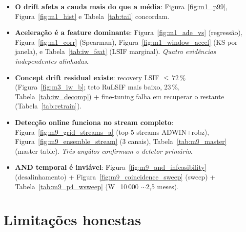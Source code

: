 \documentclass[11pt,a4paper]{article}
\begin{document}
\begin{itemize}[leftmargin=1.4em,itemsep=2pt]
    \item \textbf{O drift afeta a cauda mais do que a m\'edia}:
          Figura~\ref{fig:m1_p99}, Figura~\ref{fig:m1_hist} e
          Tabela~\ref{tab:tail} concordam.
    \item \textbf{Acelera\c{c}\~ao \'e a feature dominante}:
          Figura~\ref{fig:m1_ade_vs} (regress\~ao), Figura~\ref{fig:m1_corr}
          (Spearman), Figura~\ref{fig:m1_window_accel} (KS por janela), e
          Tabela~\ref{tab:iw_feat} (LSIF marginal). \emph{Quatro
          evid\^encias independentes alinhadas}.
    \item \textbf{Concept drift residual existe}: recovery LSIF $\leq\,72\,\%$
          (Figura~\ref{fig:m3_iw_b}; teto RuLSIF mais baixo, 23\,\%,
          Tabela~\ref{tab:iw_decomp}) + fine-tuning falha em recuperar o
          restante (Tabela~\ref{tab:retrain}).
    \item \textbf{Detec\c{c}\~ao online funciona no stream completo}:
          Figura~\ref{fig:m9_grid_streams_a} (top-5 streams ADWIN+robz),
          Figura~\ref{fig:m9_ensemble_stream} (3 canais),
          Tabela~\ref{tab:m9_master} (master table). \emph{Tr\^es
          ang\^ulos confirmam o detetor prim\'ario}.
    \item \textbf{AND temporal \'e invi\'avel}:
          Figura~\ref{fig:m9_and_infeasibility} (desalinhamento) +
          Figura~\ref{fig:m9_coincidence_sweep} (sweep) +
          Tabela~\ref{tab:m9_p4_wsweep} (W=10\,000 $\sim$2{,}5 meses).
\end{itemize}

\section{Limita\c{c}\~oes honestas}
\end{document}
